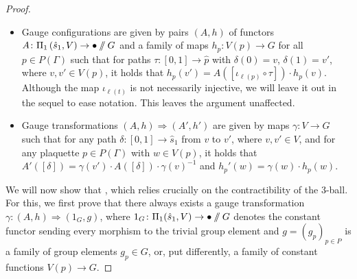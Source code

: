 \documentclass[pdftex]{sigma}
\newcommand{\sslash}{\mathbin{/\mkern-6mu/}}
\numberwithin{equation}{section}
\theoremstyle{definition}
\begin{document}
\begin{proof}
\begin{itemize}\itemsep=0pt
 \item Gauge configurations are given by pairs $(A, h)$ of functors $A\colon \Pi_1\left(\hat{s}_1, V\right) \rightarrow \bullet \sslash G$ and a family of maps $h_p\colon V(p) \rightarrow G$ for all $p \in P(\Gamma)$ such that for paths $\tau\colon [0,1] \rightarrow \hat{p}$ with $\delta(0) = v$, $\delta(1) = v'$, where $v, v' \in V(p)$, it holds that $h_p(v')= A([\iota_{\ell(p)} \circ \tau]) \cdot h_p(v)$. Although the map $\iota_{\ell(t)}$ is not necessarily injective, we will leave it out in the sequel to ease notation. This leaves the argument unaffected.
 \item Gauge transformations $(A, h) \Rightarrow (A', h')$ are given by maps $\gamma\colon V \rightarrow G$ such that for any path $\delta\colon [0,1] \rightarrow \hat{s}_1$ from $v$ to $v'$, where $v, v' \in V$, and for any plaquette $p \in P(\Gamma)$ with $w \in V(p)$, it holds that $A'([\delta]) = \gamma(v') \cdot A([\delta]) \cdot \gamma(v)^{-1}$ and $h_p'(w) = \gamma(w) \cdot h_p(w)$.
\end{itemize}
We will now show that \smash{$\mathcal{A}^{\mathbb{S}_{\Gamma} \bullet} \sslash \mathcal{G}^{\mathbb{S}_{\Gamma \bullet}} \simeq \bigl(\prod_{p \in P(\Gamma)}G\bigr) \sslash G =: G^P \sslash G$}, which relies crucially on the contractibility of the 3-ball. For this, we first prove that there always exists a gauge transformation $\gamma\colon (A,h) \Rightarrow (1_G, g)$, where $1_G\colon \Pi_1 (\hat{s}_1, V ) \rightarrow \bullet \sslash G$ denotes the constant functor sending every morphism to the trivial group element and $g = (g_p)_{p \in P}$ is a family of group elements $g_p \in G$, or, put differently, a family of constant functions $V(p) \rightarrow G$.


\end{proof}
\end{document}
